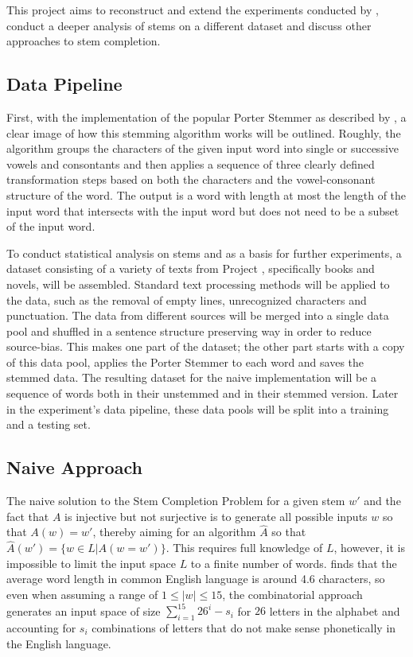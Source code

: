 \documentclass[11pt]{article}
\begin{document}
This project aims to reconstruct and extend the experiments conducted by \cite{Feinerer2010}, conduct a deeper analysis of stems on a different dataset and discuss other approaches to stem completion.

\subsection{Data Pipeline}

First, with the implementation of the popular Porter Stemmer as described by \cite{porterstemmer}, a clear image of how this stemming algorithm works will be outlined. Roughly, the algorithm groups the characters of the given input word into single or successive vowels and consontants and then applies a sequence of three clearly defined transformation steps based on both the characters and the vowel-consonant structure of the word. The output is a word with length at most the length of the input word that intersects with the input word but does not need to be a subset of the input word. 

To conduct statistical analysis on stems and as a basis for further experiments, a dataset consisting of a variety of texts from Project \cite{gutenberg}, specifically books and novels, will be assembled. Standard text processing methods will be applied to the data, such as the removal of empty lines, unrecognized characters and punctuation. The data from different sources will be merged into a single data pool and shuffled in a sentence structure preserving way in order to reduce source-bias. This makes one part of the dataset; the other part starts with a copy of this data pool, applies the Porter Stemmer to each word and saves the stemmed data. The resulting dataset for the naive implementation will be a sequence of words both in their unstemmed and in their stemmed version. Later in the experiment's data pipeline, these data pools will be split into a training and a testing set. 

\subsection{Naive Approach}

The naive solution to the Stem Completion Problem for a given stem $w'$ and the fact that $A$ is injective but not surjective is to generate all possible inputs $w$ so that $A(w)=w'$, thereby aiming for an algorithm $\hat{A}$ so that $\hat{A}(w')=\{w\in L \vert A(w=w')\}$. This requires full knowledge of $L$, however, it is impossible to limit the input space $L$ to a finite number of words. \cite{wordlength} finds that the average word length in common English language is around 4.6 characters, so even when assuming a range of $1\leq \vert w\vert \leq 15$, the combinatorial approach generates an input space of size $\sum_{i=1}^{15}26^{i}-s_i$ for $26$ letters in the alphabet and accounting for $s_i$ combinations of letters that do not make sense phonetically in the English language. 
\end{document}
